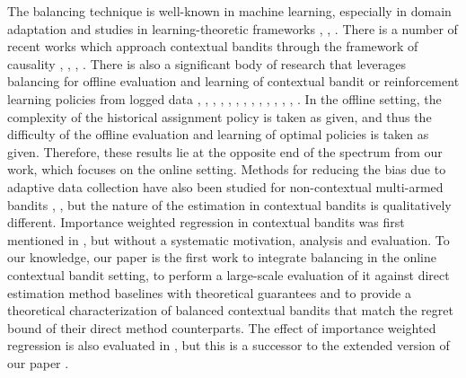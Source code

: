 \documentclass[letterpaper]{article} %
\begin{document}
The balancing technique is well-known in machine learning, especially in domain adaptation and  studies in learning-theoretic frameworks \cite{huang-ml}, \cite{zadrozny-ml}, \cite{cortes-ml}.
There is a number of recent works which approach contextual bandits through the framework of causality \cite{bareinboim-bandits}, \cite{bareinboim-fusion}, \cite{forney-fusion}, \cite{lattimore-causalbandit}.
There is also a significant body of research that leverages balancing for offline evaluation and learning of contextual bandit or reinforcement learning policies from logged data \cite{strehl2010learning}, \cite{dudik-offline-1}, \cite{li-offline-1}, \cite{dudik-offline-2}, \cite{li-offline-2}, \cite{swaminathan-offline}, \cite{jiang-offline}, \cite{thomas-offline}, \cite{athey-offline}, \cite{kallus-offline}, \cite{wang-offline}, \cite{deshpande-offline}, \cite{kallus2018policy}, \cite{zhou2018offline}.
In the offline setting, the complexity of the historical assignment policy is taken as given, and thus the difficulty of the offline evaluation and learning of optimal policies is taken as given.
Therefore, these results lie at the opposite end of the spectrum from our work, which focuses on the online setting.
Methods for reducing the bias due to adaptive data collection have also been studied for non-contextual multi-armed bandits \cite{villar-online}, \cite{nie-online}, but the nature of the estimation in contextual bandits is qualitatively different.
Importance weighted regression in contextual bandits was first mentioned in \cite{agarwal-ilovetoconbandits}, but without a systematic motivation, analysis and evaluation. To our knowledge, our paper is the first work to integrate balancing in the online contextual bandit setting, to perform a large-scale evaluation of it against direct estimation method baselines with theoretical guarantees and to provide a theoretical characterization of balanced contextual bandits that match the regret bound of their direct method counterparts. The effect of importance weighted regression is also evaluated in \cite{bietti2018contextual}, but this is a successor to the extended version of our paper \cite{dimakopoulou2017estimation}.
\end{document}
